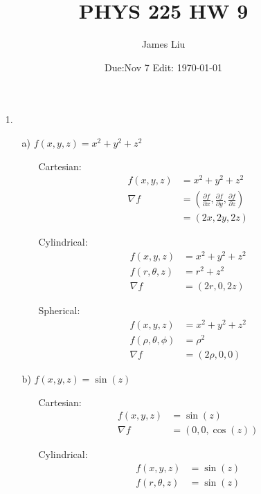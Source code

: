 \documentclass{article}
\date{Due:Nov 7 Edit: \today}
\title{PHYS 225 HW 9}
\author{James Liu}
\begin{document}
\maketitle
\begin{itemize}
    \item [1.]
    \begin{itemize}
        \item [a)] \(f(x,y,z)=x^2+y^2+z^2\)
        \begin{itemize}
            \item [Cartesian:] 
            \begin{align*}
                f(x,y,z)&=x^2+y^2+z^2\\
                \nabla f&=\left(\frac{\partial f}{\partial x},\frac{\partial f}{\partial y},\frac{\partial f}{\partial z}\right)\\
                &=\left(2x,2y,2z\right)
            \end{align*}
            \item [Cylindrical:]
            \begin{align*}
                f(x,y,z)&=x^2+y^2+z^2\\
                f(r,\theta,z)&=r^2+z^2\\
                \nabla f &=\left(2r,0,2z\right)
            \end{align*}
            \item [Spherical:]
            \begin{align*}
                f(x,y,z)&=x^2+y^2+z^2\\
                f(\rho,\theta,\phi)&=\rho^2\\
                \nabla f&=\left(2\rho,0,0\right)
            \end{align*}
        \end{itemize}
        \item [b)]  \(f(x,y,z)=\sin(z)\)
        \begin{itemize}
            \item [Cartesian:] 
            \begin{align*}
                f(x,y,z)&=\sin(z)\\
                \nabla f&=\left(0,0,\cos(z)\right)
            \end{align*}
            \item [Cylindrical:]
            \begin{align*}
                f(x,y,z)&=\sin(z)\\
                f(r,\theta,z)&=\sin(z)\\

\end{align*}
\end{itemize}
\end{itemize}
\end{itemize}
\end{document}
